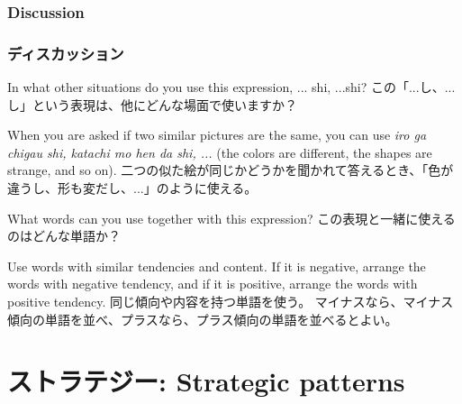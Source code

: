 \documentclass[uplatex,dvipdfmx,b5paper,english,10pt]{jsbook}
\newif\ifSTRATEGICPATTERNS
\begin{document}
\ifEnglish
\subsection{Discussion}
\else
\subsection{ディスカッション}
\fi

\begin{toiquestion}
\ifEnglish
In what other situations do you use this expression, ... shi, ...shi?
\else
この「...し、...し」という表現は、他にどんな場面で使いますか？
\fi
\end{toiquestion}
\begin{toianswer}
\ifEnglish
When you are asked if two similar pictures are the same, you can use {\it iro ga chigau shi, katachi mo hen da shi, ...\/} (the colors are different, the shapes are strange, and so on).
\else
二つの似た絵が同じかどうかを聞かれて答えるとき、「色が違うし、形も変だし、...」のように使える。
\fi
\end{toianswer}

\begin{toiquestion}
\ifEnglish
What words can you use together with this expression?
\else
この表現と一緒に使えるのはどんな単語か？
\fi
\end{toiquestion}
\begin{toianswer}
\ifEnglish
Use words with similar tendencies and content.
If it is negative, arrange the words with negative tendency, and if it is positive, arrange the words with positive tendency.
\else
同じ傾向や内容を持つ単語を使う。
マイナスなら、マイナス傾向の単語を並べ、プラスなら、プラス傾向の単語を並べるとよい。
\fi
\end{toianswer}


%

\fi%

\ifSTRATEGICPATTERNS
\ifEnglish
\chapter{Strategic patterns}
\else
\chapter{ストラテジー: Strategic patterns}
\fi
\end{document}
